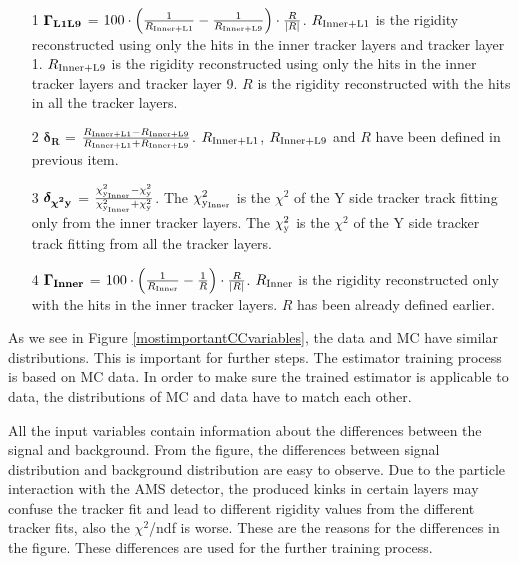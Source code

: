 \begin{itemize}
\item[1] %
$\bm{\Gamma_{\rm{L1L9}}}$ = $100 \cdot  \left ( \frac{1}{R_{\rm{Inner+L1}}}  - \frac{1}{R_{\rm{Inner+L9}}} \right )  \cdot \frac{R}{|R|}$. $R_{\rm{Inner+L1}}$ is the rigidity reconstructed using only the hits in the inner tracker layers and tracker layer 1. $R_{\rm{Inner+L9}}$ is the rigidity reconstructed using only the hits in the inner tracker layers and tracker layer 9. $R$ is the rigidity reconstructed with the hits in all the tracker layers.  
\item[2] %
$\bm{\delta_{R}}$ = $\frac{R_{\rm{Inner+L1}} - R_{\rm{Inner+L9}}}{R_{\rm{Inner+L1}} + R_{\rm{Inner+L9}}}$. $R_{\rm{Inner+L1}}$, $R_{\rm{Inner+L9}}$ and $R$ have been defined in previous item.
\item[3] %
$\bm{\delta_{\chi^2\rm{y}}}$ = $\rm \frac{\chi^2_{\rm{y}_{Inner}} - \chi^2_{\rm{y}}}{\chi^2_{\rm{y}_{Inner}} + \chi^2_{\rm{y}}}$. The $\chi^2_{\rm{y}_{Inner}}$ is the $\chi^2$ of the Y side tracker track fitting only from the inner tracker layers. The $\chi^2_{\rm{y}}$ is the $\chi^2$ of the Y side tracker track fitting from all the tracker layers.                    
\item[4] %
$\bm{\Gamma_{\rm{Inner}}}$ = $ 100 \cdot  \left ( \frac{1}{R_{\rm{Inner}}}  - \frac{1}{R} \right )  \cdot \frac{R}{|R|}$. $R_{\rm{Inner}}$ is the rigidity reconstructed only with the hits in the inner tracker layers. $R$ has been already defined earlier.
\end{itemize}

As we see in Figure \ref{mostimportantCCvariables}, the data and MC have similar distributions. This is important for further steps. The estimator training process is based on MC data. In order to make sure the trained estimator is applicable to data, the distributions of MC and data have to match each other.  \par 

All the input variables contain information about the differences between the signal and background. From the figure, the differences between signal distribution and background distribution are easy to observe. Due to the particle interaction with the AMS detector, the produced kinks in certain layers may confuse the tracker fit and lead to different rigidity values from the different tracker fits, also the $\chi^2$/ndf is worse. These are the reasons for the differences in the figure. These differences are used for the further training process. \par

